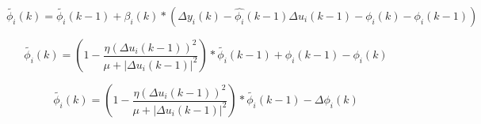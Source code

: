 \documentclass[journal,onecolumn]{IEEEtran}
\begin{document}
\begin{equation}
    \label{model 20}
    \tilde{\phi_i}(k) = \tilde{\phi_i}(k-1)+\beta_i(k) * (\Delta y_i(k) - \hat{\phi_i}(k-1)\Delta u_i(k-1) -\phi_i(k) - \phi_i(k-1))
\end{equation}

\begin{equation}
    \label{model 21}
    \tilde{\phi_i}(k) = (1-\frac{\eta(\Delta u_i(k-1))^2}{\mu + |\Delta u_i(k-1)|^2})*\tilde{\phi_i}(k-1) + \phi_i(k-1) - \phi_i(k)
\end{equation}

\begin{equation}
    \label{model 22}
    \tilde{\phi_i}(k) = (1-\frac{\eta(\Delta u_i(k-1))^2}{\mu + |\Delta u_i(k-1)|^2})*\tilde{\phi_i}(k-1) - \Delta \phi_i(k)
\end{equation}









\end{document}
